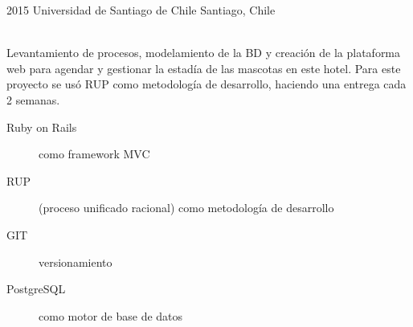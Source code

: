 \begin{entrylist}
  \entry
  {2015}
  {Universidad de Santiago de Chile}
  {Santiago, Chile}
  {\\
  Levantamiento de procesos, modelamiento de la BD y creación de la plataforma 
  web para agendar y gestionar la estadía de las mascotas en este hotel. Para 
  este proyecto se usó RUP como metodología de desarrollo, haciendo una 
  entrega cada 2 semanas.\\
  \begin{description}
    \item[Ruby on Rails] como framework MVC
    \item[RUP] (proceso unificado racional) como metodología de desarrollo
    \item[GIT] versionamiento
    \item[PostgreSQL] como motor de base de datos
  \end{description}
  }
\end{entrylist}
